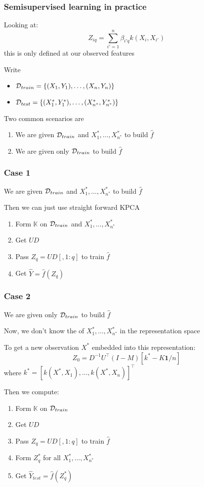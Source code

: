 \documentclass{beamer}
\begin{document}
\begin{frame}[fragile]
  \frametitle{Semisupervised learning in practice}
  Looking at:
\[
Z_{iq} = \sum_{i'=1}^n \beta_{i'q} k(X_i,X_{i'})
\]
this is only defined at our observed features

\vsp
Write 

\begin{itemize}
\item $\mathcal{D}_{train} = \{(X_1,Y_1),\ldots,(X_n,Y_n)\}$
\item $\mathcal{D}_{test} = \{(X^*_1,Y^*_1),\ldots,(X^*_{n^*},Y^*_{n^*})\}$
\end{itemize}
\vsp

Two common scenarios are
\begin{enumerate}
\item  We are given $\mathcal{D}_{train}$ and  $X^*_1,\ldots,X^*_{n^*}$ to build $\hat{f}$
\item  We are given only $\mathcal{D}_{train}$ to build $\hat{f}$
\end{enumerate}

\end{frame}

\begin{frame}[fragile]
  \frametitle{Case 1}
We are given $\mathcal{D}_{train}$ and  $X^*_1,\ldots,X^*_{n^*}$ to build $\hat{f}$

\vsp
Then we can just use straight forward KPCA


\begin{enumerate}
\item Form $\mathbb{K}$ on $\mathcal{D}_{train}$ and  $X^*_1,\ldots,X^*_{n^*}$
\item Get $UD$
\item Pass $Z_q = UD[,1:q]$ to train $\hat{f}$
\item Get $\hat{Y} = \hat{f}(Z_q)$
\end{enumerate}
\end{frame}

\begin{frame}[fragile]
  \frametitle{Case 2}
We are given only $\mathcal{D}_{train}$  to build $\hat{f}$

\vsp
Now, we don't know the  of $X^*_1,\ldots,X^*_{n^*}$
in the representation space

\vsp
To get a new observation $X^*$ embedded into this representation:
\[
Z_0 = D^{-1}U^{\top} (I - M)[k^* - K \mathbf{1}/n]
\]
where $k^* = [k(X^*,X_1),\ldots,k(X^*,X_n)]^{\top}$

\vsp
Then we compute:
\begin{enumerate}
\item Form $\mathbb{K}$ on $\mathcal{D}_{train}$
\item Get $UD$
\item Pass $Z_q = UD[,1:q]$ to train $\hat{f}$
\item Form $Z_q^*$ for all $X^*_1,\ldots,X^*_{n^*}$
\item Get $\hat{Y}_{test} = \hat{f}(Z_q^*)$
\end{enumerate}
\end{frame}
\end{document}
